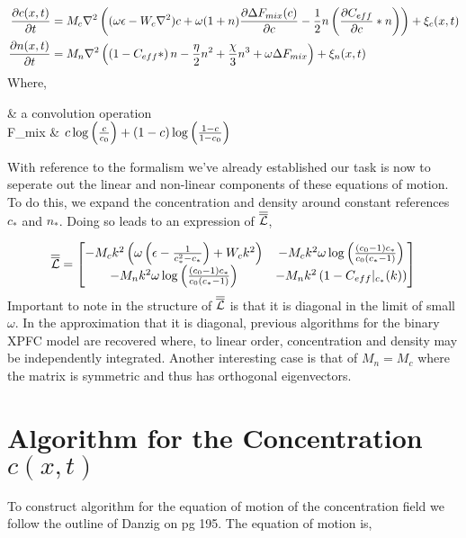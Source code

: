 \begin{align}
	\frac{\partial c(x, t)}{\partial t} 
		&= M_c \nabla^2 \left( (\omega\epsilon - W_c\nabla^2) c 
			+ \omega (1 + n) \frac{\partial \Delta F_{mix}(c)}{\partial c} 
			- \frac{1}{2} n \left(\frac{\partial C_{eff}}{\partial c} \ast n\right)
		\right) + \xi_c(x, t) \\
	\frac{\partial n(x,t)}{\partial t} &= M_n \nabla^2 \left(
		\left(1 - C_{eff} \ast \right) n	- \frac{\eta}{2} n^2 + \frac{\chi}{3}n^3 + \omega\Delta F_{mix}
	 \right)  + \xi_n(x, t)
\end{align}
Where,
\begin{conditions}
	\ast & a convolution operation \\
	\Delta F_{mix} & $c\log\left(\frac{c}{c_0}\right) + (1-c)\log\left(\frac{1-c}{1-c_0}\right)$
\end{conditions}

With reference to the formalism we've already established our task is now to seperate out the linear and non-linear components of these equations of motion. To do this, we expand the concentration and density around constant references $c_\ast$ and $n_\ast$. Doing so leads to an expression of $\overline{\overline{\mathcal{L}}}$, 

\begin{equation}
	\overline{\overline{\mathcal{L}}} = \begin{bmatrix}
	-M_c k^2 \left( \omega\left(\epsilon - \frac{1}{c_\ast^2 - c_\ast}\right) + W_c k^2\right) & -M_c k^2 \omega \log\left(\frac{(c_0-1)c_\ast}{c_0(c_\ast-1)}\right) \\
	-M_n k^2 \omega \log \left(\frac{(c_0-1)c_\ast}{c_0(c_\ast-1)}\right) & -M_n k^2 \left( 1-C_{eff}\vert_{c_\ast}(k) \right)
	\end{bmatrix}
\end{equation}
Important to note in the structure of $\overline{\overline{\mathcal{L}}}$ is that it is diagonal in the limit of small $\omega$. In the approximation that it is diagonal, previous algorithms for the binary XPFC model are recovered where, to linear order, concentration and density may be independently integrated. Another interesting case is that of $M_n = M_c$ where the matrix is symmetric and thus has orthogonal eigenvectors. 

 

\section{Algorithm for the Concentration $c(x,t)$}

To construct algorithm for the equation of motion of the concentration field we follow the outline of Danzig on pg 195. The equation of motion is, 

